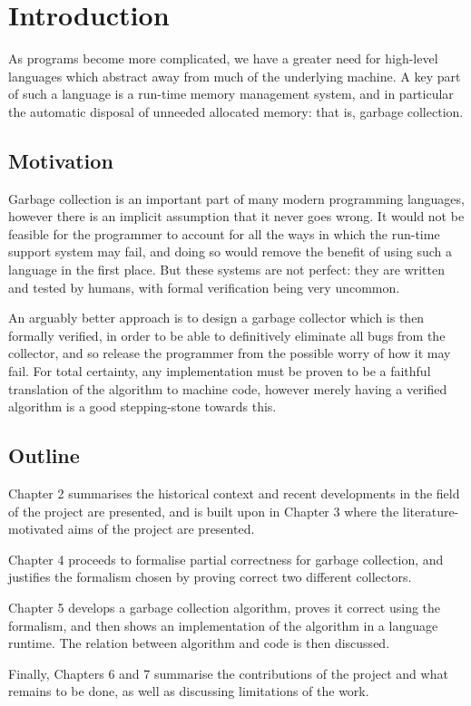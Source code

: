\chapter{Introduction}

As programs become more complicated, we have a greater need for
high-level languages which abstract away from much of the underlying
machine. A key part of such a language is a run-time \gls{memory
  management} system, and in particular the automatic disposal of
unneeded allocated memory: that is, \gls{garbage collection}.

\section{Motivation}

Garbage collection is an important part of many modern programming
languages, however there is an implicit assumption that it never goes
wrong. It would not be feasible for the programmer to account for all
the ways in which the run-time support system may fail, and doing so
would remove the benefit of using such a language in the first
place. But these systems are not perfect: they are written and tested
by humans, with formal verification being very uncommon.

An arguably better approach is to design a \gls{garbage collector}
which is then formally verified, in order to be able to definitively
eliminate all bugs from the \gls{collector}, and so release the
programmer from the possible worry of how it may fail. For total
certainty, any implementation must be proven to be a faithful
translation of the algorithm to machine code, however merely having a
verified algorithm is a good stepping-stone towards this.

\section{Outline}

Chapter 2 summarises the historical context and recent developments in
the field of the project are presented, and is built upon in Chapter 3
where the literature-motivated aims of the project are presented.

Chapter 4 proceeds to formalise partial correctness for
garbage collection, and justifies the formalism chosen by proving
correct two different collectors.

Chapter 5 develops a garbage collection algorithm, proves it
correct using the formalism, and then shows an implementation of the
algorithm in a language runtime. The relation between algorithm and
code is then discussed.

Finally, Chapters 6 and 7 summarise the contributions of the project
and what remains to be done, as well as discussing limitations of the
work.
